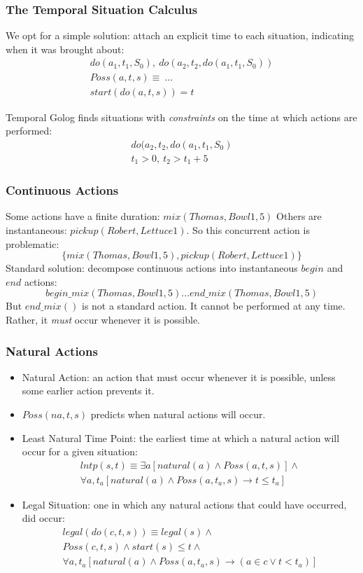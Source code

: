 \documentclass[compress]{beamer}
\begin{document}
\begin{frame}
\frametitle{The Temporal Situation Calculus}
We opt for a simple solution: attach an explicit time to each situation,
indicating when it was brought about:\[
\begin{array}{c}
do(a_1,t_1,S_0),\ do(a_2,t_2,do(a_1,t_1,S_0))\\
Poss(a,t,s) \equiv\ \dots\\
start(do(a,t,s)) = t
\end{array}\]

Temporal Golog finds situations with \emph{constraints} on the
time at which actions are performed:\[
\begin{array}{c}
do(a_2,t_2,do(a_1,t_1,S_0)\\
t_1>0,\ t_2>t_1+5
\end{array}\]
\end{frame}


\begin{frame}
\frametitle{Continuous Actions}
Some actions have a finite duration: $mix(Thomas,Bowl1,5)$
Others are instantaneous: $pickup(Robert,Lettuce1)$.
So this concurrent action is problematic:\[
\{mix(Thomas,Bowl1,5),pickup(Robert,Lettuce1)\}\]
Standard solution: decompose continuous actions into instantaneous $begin$
and $end$ actions:\[
begin\_mix(Thomas,Bowl1,5) \dots end\_mix(Thomas,Bowl1,5)\]
But $end\_mix()$ is not a standard action.  It cannot be performed at
any time.  Rather, it \emph{must} occur whenever it is possible.
\end{frame}

\begin{frame}
\frametitle{Natural Actions}
\begin{itemize}
  \item Natural Action:  an action that must occur whenever it is possible,
        unless some earlier action prevents it.
  \item $Poss(na,t,s)$ predicts when natural actions will occur.
  \item Least Natural Time Point: the earliest time at which a natural
        action will occur for a given situation:\[
\begin{array}{c}
lntp(s,t) \equiv \exists a [natural(a) \wedge Poss(a,t,s)] \wedge\\
\forall a,t_a [natural(a) \wedge Poss(a,t_a,s) \rightarrow t \leq t_a]
\end{array}\]
  \item Legal Situation: one in which any natural actions that could have occurred, did occur:\[
\begin{array}{c}
legal(do(c,t,s)) \equiv legal(s) \wedge\\
Poss(c,t,s) \wedge start(s) \leq t \wedge\\
\forall a,t_a [natural(a) \wedge Poss(a,t_a,s) \rightarrow (a \in c \vee t < t_a)]
\end{array}\]
\end{itemize}
\end{frame}
\end{document}
